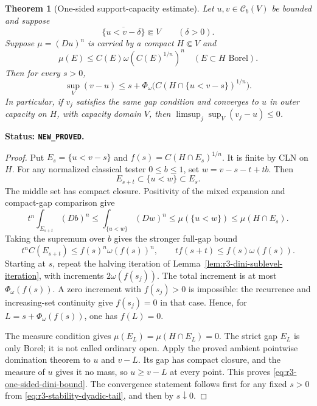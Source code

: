\documentclass[11pt,a4paper]{article}
\numberwithin{equation}{section}
\newtheorem{theorem}{Theorem}[section]
\theoremstyle{definition}
\theoremstyle{remark}
\newcommand{\Cb}{\mathcal C_b}
\begin{document}
\begin{theorem}[One-sided support-capacity estimate]
\label{thm:r3-one-sided-dini-stability}
Let $u,v\in\Cb(V)$ be bounded and suppose
\[
 \overline{\{u<v-\delta\}}\Subset V\qquad(\delta>0).
\]
Suppose $\mu=(Du)^n$ is carried by a compact $H\Subset V$ and
\begin{equation}\label{eq:r3-stability-dini-measure}
 \mu(E)\leq C(E)\omega(C(E)^{1/n})^n
             \quad(E\subset H\text{ Borel}).
\end{equation}
Then for every $s>0$,
\begin{equation}\label{eq:r3-one-sided-dini-bound}
 \sup_V(v-u)\leq s+\Phi_\omega\bigl(
                  C(H\cap\{u<v-s\})^{1/n}\bigr).
\end{equation}
In particular, if $v_j$ satisfies the same gap condition and
converges to $u$ in outer capacity on $H$, with capacity domain
$V$, then $\limsup_j\sup_V(v_j-u)\leq0$.
\end{theorem}

\noindent\textbf{Status: \texttt{NEW\_PROVED}.}

\begin{proof}
Put $E_s=\{u<v-s\}$ and $f(s)=C(H\cap E_s)^{1/n}$.
It is finite by CLN on $H$. For any normalized classical tester
$0\leq b\leq1$, set $w=v-s-t+tb$. Then
\[
 E_{s+t}\subset\{u<w\}\subset E_s.
\]
The middle set has compact closure. Positivity of the mixed
expansion and compact-gap comparison give
\[
 t^n\int_{E_{s+t}}(Db)^n
 \leq\int_{\{u<w\}}(Dw)^n
 \leq\mu(\{u<w\})\leq\mu(H\cap E_s).
\]
Taking the supremum over $b$ gives the stronger full-gap bound
\begin{equation}\label{eq:r3-stability-recurrence}
 t^n C(E_{s+t})\leq f(s)^n\omega(f(s))^n,
 \qquad t f(s+t)\leq f(s)\omega(f(s)).
\end{equation}
Starting at $s$, repeat the halving iteration of
Lemma~\ref{lem:r3-dini-sublevel-iteration}, with increments
$2\omega(f(s_j))$. The total increment is at most
$\Phi_\omega(f(s))$. A zero increment with $f(s_j)>0$ is
impossible: the recurrence and increasing-set continuity give
$f(s_j)=0$ in that case. Hence, for
$L=s+\Phi_\omega(f(s))$, one has $f(L)=0$.

The measure condition gives $\mu(E_L)=\mu(H\cap E_L)=0$.
The strict gap $E_L$ is only Borel; it is not called ordinary
open. Apply the proved ambient pointwise domination theorem to
$u$ and $v-L$. Its gap has compact closure, and the measure of
$u$ gives it no mass, so $u\geq v-L$ at every point. This proves
\eqref{eq:r3-one-sided-dini-bound}. The convergence statement
follows first for any fixed $s>0$ from
\eqref{eq:r3-stability-dyadic-tail}, and then by $s\downarrow0$.
\end{proof}
\end{document}
